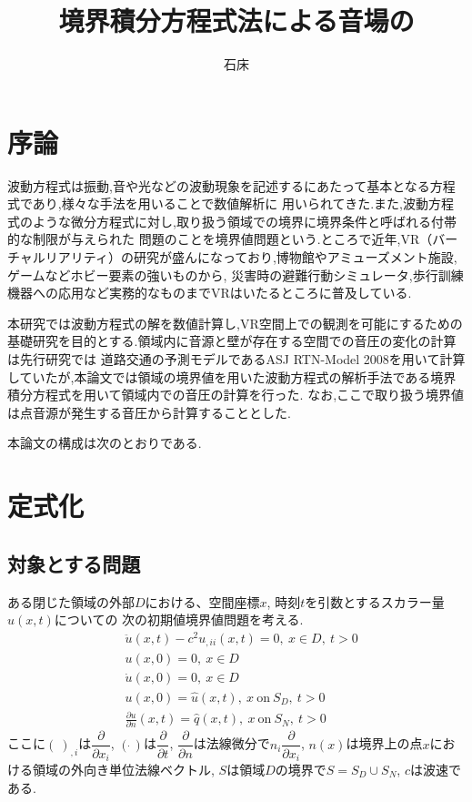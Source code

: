 \documentclass[dvipdfmx]{ampbt}
\title{境界積分方程式法による音場の}     %
      {数値解析と移動する受音点における}      %
      {リアルタイム可聴化について}                %
\author{石床}{竜一}             %
\begin{document}
\ifoutputbody
\makeinsidecover                %
\makeabstract                   %
\maketoc                        %
\setcounter{page}{1}            %
\section{序論}
波動方程式は振動,音や光などの波動現象を記述するにあたって基本となる方程式であり,様々な手法を用いることで数値解析に
用いられてきた.また,波動方程式のような微分方程式に対し,取り扱う領域での境界に境界条件と呼ばれる付帯的な制限が与えられた
問題のことを境界値問題という.ところで近年,VR（バーチャルリアリティ）の研究が盛んになっており,博物館やアミューズメント施設,ゲームなどホビー要素の強いものから,
災害時の避難行動シミュレータ\cite{vrsaigai},歩行訓練機器への応用\cite{vrmedical}など実務的なものまでVRはいたるところに普及している.\par
本研究では波動方程式の解を数値計算し,VR空間上での観測を可能にするための基礎研究を目的とする.領域内に音源と壁が存在する空間での音圧の変化の計算は先行研究\cite{vrsound}では
道路交通の予測モデルであるASJ RTN-Model 2008を用いて計算していたが,本論文では領域の境界値を用いた波動方程式の解析手法である境界積分方程式を用いて領域内での音圧の計算を行った.
なお,ここで取り扱う境界値は点音源が発生する音圧から計算することとした.\par

本論文の構成は次のとおりである.

\section{定式化}
\label{2章}
\subsection{対象とする問題}
ある閉じた領域の外部$D$における、空間座標$x$, 時刻$t$を引数とするスカラー量$u(x,t)$についての
次の初期値境界値問題を考える.
\begin{align}
&\ddot{u}(x,t)-c^2 u_{,ii}(x,t)=0,\  x \in D,\ t>0 \\
&u(x,0)=0,\  x \in D \\
&\dot{u}(x,0)=0,\  x \in D \\
&u(x,0)=\hat{u}(x,t),\  x\  \mbox{on} \ S_D,\ t>0 \\
&\frac{\partial{u}}{\partial{n}} (x,t)=\hat{q}(x,t),\  x\  \mbox{on} \ S_N,\ t>0
\end{align}
ここに$(\ )_{,i}$は$\dfrac{\partial{}}{\partial{x_i}}$,
$(\dot{\ })$は$\dfrac{\partial{}}{\partial{t}}$,
$\dfrac{\partial{}}{\partial{n}}$は法線微分で$n_i \dfrac{\partial{}}{\partial{x_i}}$,
$n(x)$は境界上の点$x$における領域の外向き単位法線ベクトル,
$S$は領域$D$の境界で$S=S_D \cup S_N$,
$c$は波速である.
\end{document}

